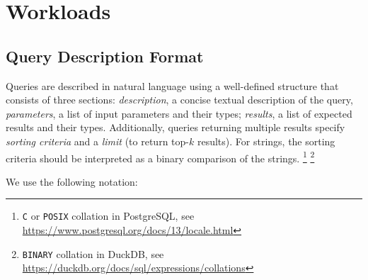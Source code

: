 \chapter{Workloads}
\label{sec:workloads}


\section{Query Description Format}
\label{sub:queries_structure}

Queries are described in natural language using a well-defined structure that consists of three sections:
\textit{description}, a concise textual description of the query,
\textit{parameters}, a list of input parameters and their types;
\textit{results}, a list of expected results and their types.
Additionally, queries returning multiple results specify \emph{sorting criteria} and a \emph{limit} (to return top-$k$ results).
For strings, the sorting criteria should be interpreted as a binary comparison of the strings.%
\footnote{\texttt{C} or \texttt{POSIX} collation in PostgreSQL, see \url{https://www.postgresql.org/docs/13/locale.html}}%
\footnote{\texttt{BINARY} collation in DuckDB, see \url{https://duckdb.org/docs/sql/expressions/collations}}

We use the following notation:

